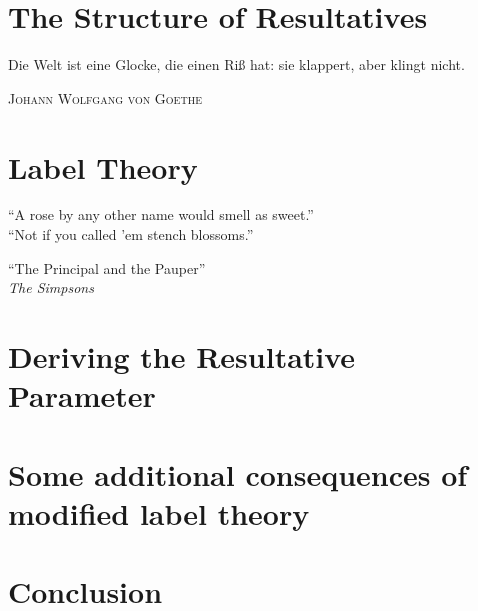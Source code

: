 \documentclass[
	draft
	]{ut-thesis}
\theoremstyle{definition}
\begin{document}
\chapter{The Structure of Resultatives}
\epigraph{Die Welt ist eine Glocke, die einen Ri\ss{} hat: sie klappert, aber klingt nicht.}{\textsc{Johann Wolfgang von Goethe}}

\chapter{Label Theory}
\epigraph{``A rose by any other name would smell as sweet.''\\
``Not if you called 'em stench blossoms.''}{``The Principal and the Pauper''\\\textit{The Simpsons}}

%
\chapter{Deriving the Resultative Parameter}\label{sec:deriving}
%
\chapter{Some additional consequences of modified label theory}
\chapter{Conclusion}\label{sec:Conclusion}
\printbibliography
\end{document}

